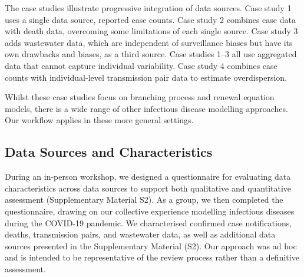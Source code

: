 \documentclass{article}
\begin{document}
The case studies illustrate progressive integration of data sources.
Case study 1 uses a single data source, reported case counts.
Case study 2 combines case data with death data, overcoming some limitations of each single source. Case study 3 adds wastewater data, which are independent of surveillance biases but have its own drawbacks and biases, as a third source. Case studies 1--3 all use aggregated data that cannot capture individual variability. Case study 4 combines case counts with individual-level transmission pair data to estimate overdispersion.

Whilst these case studies focus on branching process and renewal equation models, there is a wide range of other infectious disease modelling approaches. Our workflow applies in these more general settings.

\subsection{Data Sources and Characteristics}

During an in-person workshop, we designed a questionnaire for evaluating data characteristics across data sources to support both qualitative and quantitative assessment (Supplementary Material S2).
As a group, we then completed the questionnaire, drawing on our collective experience modelling infectious diseases during the COVID-19 pandemic.
We characterised confirmed case notifications, deaths, transmission pairs, and wastewater data, as well as additional data sources presented in the Supplementary Material (S2). Our approach was ad hoc and is intended to be representative of the review process rather than a definitive assessment.
\end{document}

